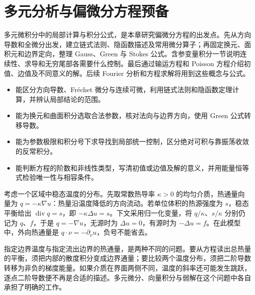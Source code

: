 \chapter{多元分析与偏微分方程预备}
\label{b2:ch:01}
\begin{chapterabstract}
多元微积分中的局部计算与积分公式，是本章研究偏微分方程的出发点。先从方向导数和全微分出发，建立链式法则、隐函数描述及常用微分算子；再固定换元、面积元和边界定向，整理 Gauss、Green 与 Stokes 公式。含参变量积分一节说明连续性、求导和无穷尾部各需要什么控制。最后通过输运方程和 Poisson 方程介绍初值、边值及不同意义的解。后续 Fourier 分析和方程求解将用到这些概念与公式。
\end{chapterabstract}

\begin{learninggoals}
\begin{itemize}
\item\label{b2:item:01-goal-differential}能区分方向导数、Fréchet 微分与连续可微，利用链式法则和隐函数定理计算，并辨认局部结论的范围。
\item\label{b2:item:01-goal-vector}能为换元和曲面积分选取合法参数，核对法向与边界方向，使用 Green 公式转移导数。
\item\label{b2:item:01-goal-parameter}能为参数极限和积分号下求导找到局部统一控制，区分绝对可积与靠振荡收敛的反常积分。
\item\label{b2:item:01-goal-pde}能判断方程的阶数和非线性类型，写清初值或边值及解的意义，并用能量恒等式检验唯一性与相容条件。
\end{itemize}
\end{learninggoals}

考虑一个区域中稳态温度的分布。先取常数热导率 \(\kappa>0\) 的均匀介质，热通量向量为 \(q=-\kappa\nabla u\)：热量沿温度降低的方向流动。若单位体积的热源强度为 \(s\)，稳态平衡给出 \(\operatorname{div}q=s\)，即 \(-\kappa\Delta u=s\)。下文采用归一化变量，将 \(q/\kappa\)、\(s/\kappa\) 分别仍记为 \(q\)、\(f\)，于是 \(q=-\nabla u\)，无源时为 \(\Delta u=0\)，有源时为 \(-\Delta u=f\)。在此模型中，外向热通量是 \(q\cdot\nu=-\partial_\nu u\)，负号不能省去。

\ProseParagraphBreak

指定边界温度与指定流出边界的热通量，是两种不同的问题。要从方程读出总热量的平衡，须把内部的散度积分变成边界通量；要比较两个温度分布，须把二阶导数转移为非负的梯度能量。如果介质在界面两侧不同，温度的斜率还可能发生跳跃，逐点二阶导数便不再是合适的描述。多元微分、向量积分与弱解在这个问题中各自承担了明确的工作。

